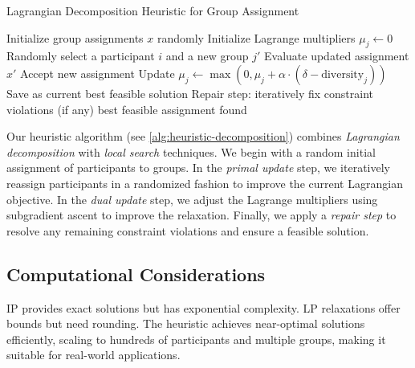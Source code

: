 \begin{algorithm}[htbp]
\caption{Lagrangian Decomposition Heuristic for Group Assignment}
\label{alg:heuristic-decomposition}
\begin{algorithmic}[1]
\State Initialize group assignments $x$ randomly
\State Initialize Lagrange multipliers $\mu_j \gets 0$
        \State Randomly select a participant $i$ and a new group $j'$
            \State Evaluate updated assignment $x'$
                \State Accept new assignment
            \EndIf
        \EndIf
    \EndFor
        \State Update $\mu_j \gets \max(0, \mu_j + \alpha \cdot (\delta - \text{diversity}_j))$
    \EndFor
        \State Save as current best feasible solution
    \EndIf
\EndFor
\State Repair step: iteratively fix constraint violations (if any)
\State \Return best feasible assignment found
\end{algorithmic}
\end{algorithm}

Our heuristic algorithm (see \cref{alg:heuristic-decomposition})
combines \emph{Lagrangian decomposition} with \emph{local search} techniques.
We begin with a random initial assignment of participants to groups.
In the \emph{primal update} step, we iteratively reassign participants in a randomized fashion
to improve the current Lagrangian objective.
In the \emph{dual update} step, we adjust the Lagrange multipliers using subgradient ascent to improve the relaxation.
Finally, we apply a \emph{repair step} to resolve any remaining constraint violations and ensure a feasible solution.

\subsection*{Computational Considerations}
IP provides exact solutions but has exponential complexity.
LP relaxations offer bounds but need rounding.
The heuristic achieves near-optimal solutions efficiently, scaling to hundreds of participants and multiple groups,
making it suitable for real-world applications.